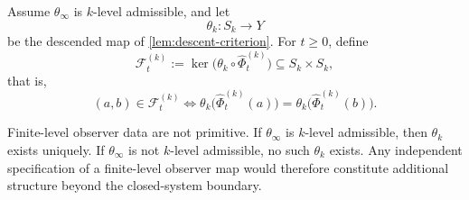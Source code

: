 \begin{definition}
	Assume \(\theta_\infty\) is \(k\)-level admissible, and let
	\[
		\theta_k\colon S_k\to Y
	\]
	be the descended map of \cref{lem:descent-criterion}.  For \(t\ge 0\),
	define
	\[
		\mathcal F_t^{(k)}
		:=
		\ker\bigl(\theta_k\circ \widehat\Phi_t^{(k)}\bigr)
		\subseteq S_k\times S_k,
	\]
	that is,
	\[
		(a,b)\in \mathcal F_t^{(k)}
		\iff
		\theta_k\bigl(\widehat\Phi_t^{(k)}(a)\bigr)
		=
		\theta_k\bigl(\widehat\Phi_t^{(k)}(b)\bigr).
	\]
\end{definition}
\begin{remark}
	Finite-level observer data are not primitive.
	If \(\theta_\infty\) is \(k\)-level admissible, then \(\theta_k\)
	exists uniquely.  If \(\theta_\infty\) is not \(k\)-level admissible,
	no such \(\theta_k\) exists.  Any independent specification of a
	finite-level observer map would therefore constitute additional
	structure beyond the closed-system boundary.
\end{remark}
